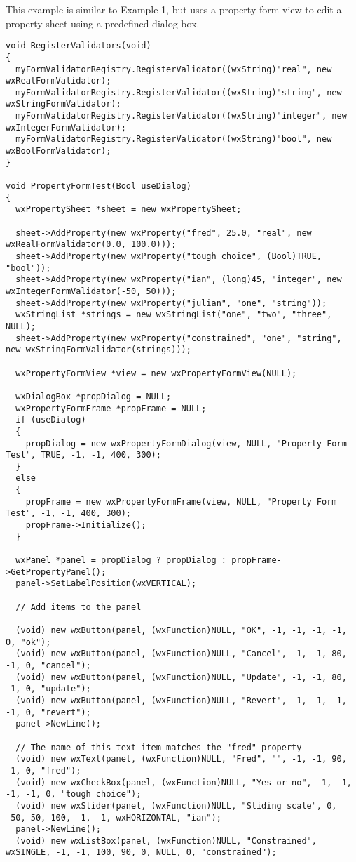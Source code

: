 This example is similar to Example 1, but uses a property form view to
edit a property sheet using a predefined dialog box.

\begin{verbatim}
void RegisterValidators(void)
{
  myFormValidatorRegistry.RegisterValidator((wxString)"real", new wxRealFormValidator);
  myFormValidatorRegistry.RegisterValidator((wxString)"string", new wxStringFormValidator);
  myFormValidatorRegistry.RegisterValidator((wxString)"integer", new wxIntegerFormValidator);
  myFormValidatorRegistry.RegisterValidator((wxString)"bool", new wxBoolFormValidator);
}

void PropertyFormTest(Bool useDialog)
{
  wxPropertySheet *sheet = new wxPropertySheet;

  sheet->AddProperty(new wxProperty("fred", 25.0, "real", new wxRealFormValidator(0.0, 100.0)));
  sheet->AddProperty(new wxProperty("tough choice", (Bool)TRUE, "bool"));
  sheet->AddProperty(new wxProperty("ian", (long)45, "integer", new wxIntegerFormValidator(-50, 50)));
  sheet->AddProperty(new wxProperty("julian", "one", "string"));
  wxStringList *strings = new wxStringList("one", "two", "three", NULL);
  sheet->AddProperty(new wxProperty("constrained", "one", "string", new wxStringFormValidator(strings)));

  wxPropertyFormView *view = new wxPropertyFormView(NULL);

  wxDialogBox *propDialog = NULL;
  wxPropertyFormFrame *propFrame = NULL;
  if (useDialog)
  {
    propDialog = new wxPropertyFormDialog(view, NULL, "Property Form Test", TRUE, -1, -1, 400, 300);
  }
  else
  {
    propFrame = new wxPropertyFormFrame(view, NULL, "Property Form Test", -1, -1, 400, 300);
    propFrame->Initialize();
  }
  
  wxPanel *panel = propDialog ? propDialog : propFrame->GetPropertyPanel();
  panel->SetLabelPosition(wxVERTICAL);
  
  // Add items to the panel
  
  (void) new wxButton(panel, (wxFunction)NULL, "OK", -1, -1, -1, -1, 0, "ok");
  (void) new wxButton(panel, (wxFunction)NULL, "Cancel", -1, -1, 80, -1, 0, "cancel");
  (void) new wxButton(panel, (wxFunction)NULL, "Update", -1, -1, 80, -1, 0, "update");
  (void) new wxButton(panel, (wxFunction)NULL, "Revert", -1, -1, -1, -1, 0, "revert");
  panel->NewLine();
  
  // The name of this text item matches the "fred" property
  (void) new wxText(panel, (wxFunction)NULL, "Fred", "", -1, -1, 90, -1, 0, "fred");
  (void) new wxCheckBox(panel, (wxFunction)NULL, "Yes or no", -1, -1, -1, -1, 0, "tough choice");
  (void) new wxSlider(panel, (wxFunction)NULL, "Sliding scale", 0, -50, 50, 100, -1, -1, wxHORIZONTAL, "ian");
  panel->NewLine();
  (void) new wxListBox(panel, (wxFunction)NULL, "Constrained", wxSINGLE, -1, -1, 100, 90, 0, NULL, 0, "constrained");


\end{verbatim}

